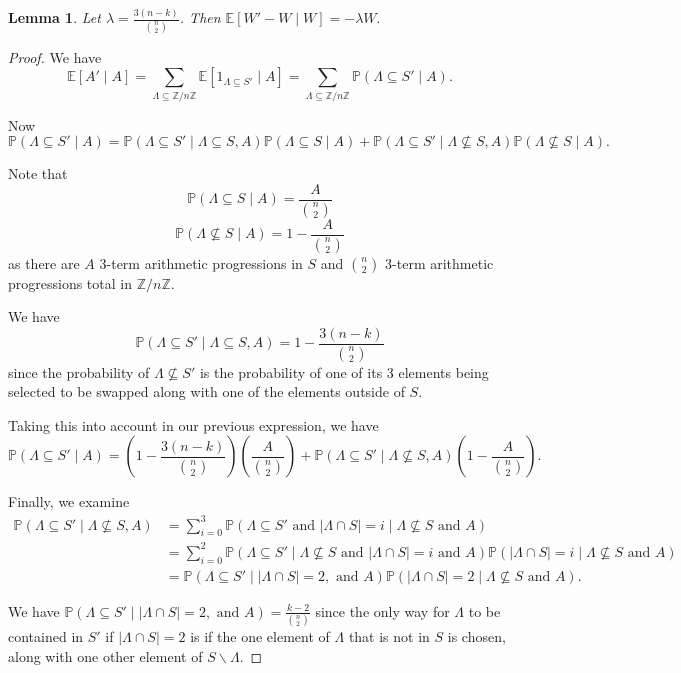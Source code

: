 \documentclass[12pt]{article} %
\newcommand{\p}[1]{\left(#1\right)}
\newcommand{\abs}[1]{\left\lvert#1\right\rvert}
\renewcommand{\P}{\mathbb{P}}
\newcommand{\E}{\mathbb{E}}
\newcommand{\Z}{\mathbb{Z}}
\newtheorem{lem}[thm]{Lemma}
\theoremstyle{definition}
\theoremstyle{definition}
\begin{document}
\begin{lem}
Let $\lambda = \frac{3(n-k)}{\binom{n}{2}}$. Then $\E[W'-W \mid W]= -\lambda W.$
\end{lem}
\begin{proof}
We have 
\[\E[A' \mid A] = \sum_{\Lambda \subseteq \Z / n\Z} \E[1_{\Lambda \subseteq S'} \mid A] = \sum_{\Lambda \subseteq \Z / n\Z} \P(\Lambda \subseteq S' \mid A).\]

Now \[ \P(\Lambda \subseteq S' \mid A) = \P(\Lambda \subseteq S' \mid \Lambda \subseteq S, A)\P(\Lambda \subseteq S \mid A) + \P(\Lambda \subseteq S' \mid \Lambda \not \subseteq S, A)\P(\Lambda \not \subseteq S \mid A).
\]

Note that 
\[\P(\Lambda \subseteq S \mid A) = \frac{A}{\binom{n}{2}}\]
\[\P(\Lambda \not \subseteq S \mid A) = 1-\frac{A}{\binom{n}{2}}\]
as there are $A$ 3-term arithmetic progressions in $S$ and $\binom{n}{2}$ 3-term arithmetic progressions total in $\Z / n\Z$.

We have \[\P(\Lambda \subseteq S' \mid \Lambda \subseteq S, A) = 1- \frac{3(n-k)}{{{n}\choose{2}}}
\]
since the probability of $\Lambda \not \subseteq S'$ is the probability of one of its 3 elements being selected to be swapped along with one of the elements outside of $S$.

Taking this into account in our previous expression, we have
\[ \P(\Lambda \subseteq S' \mid A) = \p{1- \frac{3(n-k)}{{{n}\choose{2}}}}\p{\frac{A}{\binom{n}{2}}} + \P(\Lambda \subseteq S' \mid \Lambda \not \subseteq S, A)\p{1-\frac{A}{\binom{n}{2}}}. \]

Finally, we examine 
\begin{align*}
\P(\Lambda \subseteq S' \mid \Lambda \not \subseteq S, A) &= \sum_{i = 0}^{3} \P(\Lambda \subseteq S' \text{ and } \abs{\Lambda \cap S} = i \mid \Lambda \not \subseteq S \text{ and } A) \\
&= \sum_{i = 0}^{2} \P(\Lambda \subseteq S' \mid \Lambda \not \subseteq S \text{ and } \abs{\Lambda \cap S} = i  \text{ and } A)\P(\abs{\Lambda \cap S} = i \mid \Lambda \not \subseteq S \text{ and } A) \\
&= \P(\Lambda \subseteq S' \mid \abs{\Lambda \cap S} = 2, \text{ and } A)\P(\abs{\Lambda \cap S} = 2 \mid \Lambda \not \subseteq S\text{ and } A).
\end{align*}

We have $\P(\Lambda \subseteq S' \mid \abs{\Lambda \cap S} = 2, \text{ and } A) = \frac{k-2}{{n\choose2}}$ since the only way for $\Lambda$ to be contained in $S'$ if $\abs{\Lambda \cap S} = 2$ is if the one element of $\Lambda$ that is not in $S$ is chosen, along with one other element of $S \backslash \Lambda$.


\end{proof}
\end{document}
